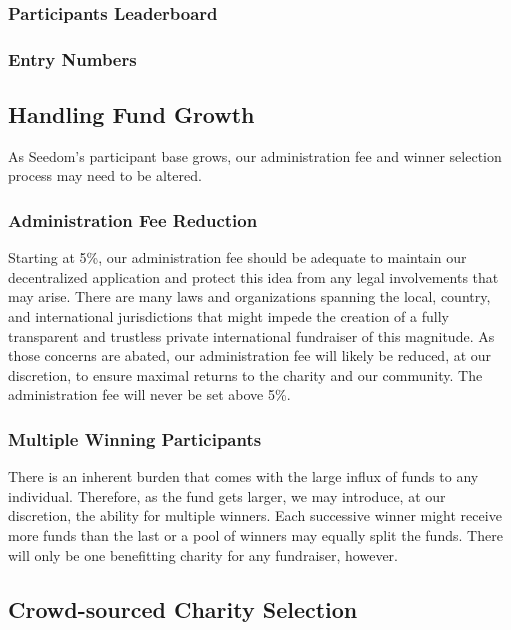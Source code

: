 \documentclass[11pt]{article}
\begin{document}
\subsubsection{Participants Leaderboard}

\subsubsection{Entry Numbers}

\subsection{Handling Fund Growth}

As Seedom's participant base grows, our administration fee and winner selection process may need to be altered.

\subsubsection{Administration Fee Reduction}

Starting at 5\%, our administration fee should be adequate to maintain our decentralized application and protect this idea from any legal involvements that may arise. There are many laws and organizations spanning the local, country, and international jurisdictions that might impede the creation of a fully transparent and trustless private international fundraiser of this magnitude. As those concerns are abated, our administration fee will likely be reduced, at our discretion, to ensure maximal returns to the charity and our community. The administration fee will never be set above 5\%.

\subsubsection{Multiple Winning Participants}

There is an inherent burden that comes with the large influx of funds to any individual. Therefore, as the fund gets larger, we may introduce, at our discretion, the ability for multiple winners. Each successive winner might receive more funds than the last or a pool of winners may equally split the funds. There will only be one benefitting charity for any fundraiser, however.

\subsection{Crowd-sourced Charity Selection}
\end{document}
